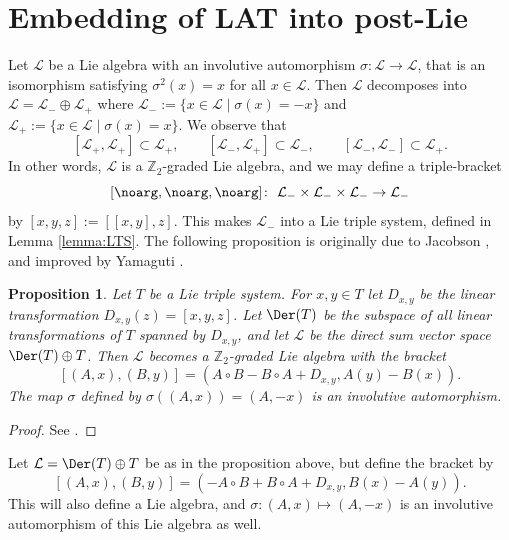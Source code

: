 \documentclass[pdftex]{sigma}
\numberwithin{equation}{section}
\newtheorem{Proposition}[Theorem]{Proposition}
 { \theoremstyle{definition}
\newtheorem{Definition}[Theorem]{Definition}
\newtheorem{Note}[Theorem]{Note}
\newtheorem{Example}[Theorem]{Example}
\newtheorem{Remark}[Theorem]{Remark} }
\begin{document}
\section{Embedding of LAT into post-Lie}\label{sec:PL-emb}

Let $\mathcal{L}$ be a Lie algebra with an involutive automorphism $\sigma \colon \mathcal{L} \rightarrow \mathcal{L}$, that is an isomorphism satisfying $\sigma^2(x) = x$ for all $x \in \mathcal{L}$. Then $\mathcal{L}$ decomposes into $\mathcal{L} = \mathcal{L}_- \oplus \mathcal{L}_+$ where $\mathcal{L}_- := \{ x \in \mathcal{L} \mid \sigma(x) = -x \}$ and $\mathcal{L}_+ := \{ x \in \mathcal{L} \mid \sigma(x) = x \}$. We observe that
\[
[\mathcal{L}_+ , \mathcal{L}_+] \subset \mathcal{L}_+, \qquad [\mathcal{L}_- , \mathcal{L}_+] \subset \mathcal{L}_-, \qquad [\mathcal{L}_- , \mathcal{L}_- ] \subset \mathcal{L}_+.
\]
In other words, $\mathcal{L}$ is a $\mathbb{Z}_2$-graded Lie algebra, and we may define a triple-bracket
\[
[\noarg, \noarg, \noarg ] \colon \ \mathcal{L}_- \times \mathcal{L}_- \times \mathcal{L}_- \rightarrow \mathcal{L}_-
\]
by $[x,y,z] := [[x,y],z]$. This makes $\mathcal{L}_-$ into a Lie triple system, defined in Lemma \ref{lemma:LTS}. The following proposition is originally due to Jacobson \cite{Jacobson1951}, and improved by Yamaguti \cite{yamaguti1957}.

\begin{Proposition}\label{prop:LTSembedding}
Let $T$ be a Lie triple system. For $x,y \in T$ let $D_{x,y}$ be the linear transformation $D_{x,y}(z) = [x,y,z]$. Let $\Der(T)$ be the subspace of all linear transformations of $T$ spanned by $D_{x,y}$, and let $\mathcal{L}$ be the direct sum vector space $\Der(T) \oplus T$. Then $\mathcal{L}$ becomes a $\mathbb{Z}_2$-graded Lie algebra with the bracket
\[
[(A,x),(B,y)] = (A\circ B - B \circ A + D_{x,y} , A(y) - B(x)).
\]
The map $\sigma$ defined by $\sigma((A,x)) = (A,-x)$ is an involutive automorphism.
\end{Proposition}

\begin{proof}
See \cite[Proposition 2.3]{Loos1}.
\end{proof}


\begin{Remark}\label{rmrk:82}
Let $\mathcal{L} = \Der(T) \oplus T$ be as in the proposition above, but define the bracket by
\[
[(A,x),(B,y)] = (-A\circ B + B \circ A + D_{x,y}, B(x) - A(y)).
\]
This will also define a Lie algebra, and $\sigma\colon (A,x) \mapsto (A,-x)$ is an involutive automorphism of this Lie algebra as well.
\end{Remark}
\end{document}
